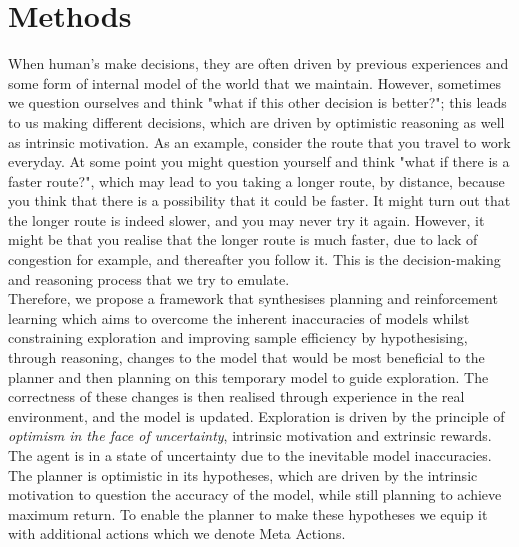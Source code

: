 \chapter{Methods}
\label{chapter3}
When human's make decisions, they are often driven by previous experiences and some form of internal model of the world that we maintain. However, sometimes we question ourselves and think "what if this other decision is better?"; this leads to us making different decisions, which are driven by optimistic reasoning as well as intrinsic motivation. As an example, consider the route that you travel to work everyday. At some point you might question yourself and think "what if there is a faster route?", which may lead to you taking a longer route, by distance, because you think that there is a possibility that it could be faster. It might turn out that the longer route is indeed slower, and you may never try it again. However, it might be that you realise that the longer route is much faster, due to lack of congestion for example, and thereafter you follow it. This is the decision-making and reasoning process that we try to emulate.
\\Therefore, we propose a framework that synthesises planning and reinforcement learning which aims to overcome the inherent inaccuracies of models whilst constraining exploration  and improving sample efficiency by hypothesising, through reasoning, changes to the model that would be most beneficial to the planner and then planning on this temporary model to guide exploration. The correctness of these changes is then realised through experience in the real environment, and the model is updated.
Exploration is driven by the principle of \textit{optimism in the face of uncertainty}, intrinsic motivation and extrinsic rewards. The agent is in a state of uncertainty due to the inevitable model inaccuracies. The planner is optimistic in its hypotheses, which are driven by the intrinsic motivation to question the accuracy of the model, while still planning to achieve maximum return. To enable the planner to make these hypotheses we equip it with additional actions which we denote Meta Actions.


